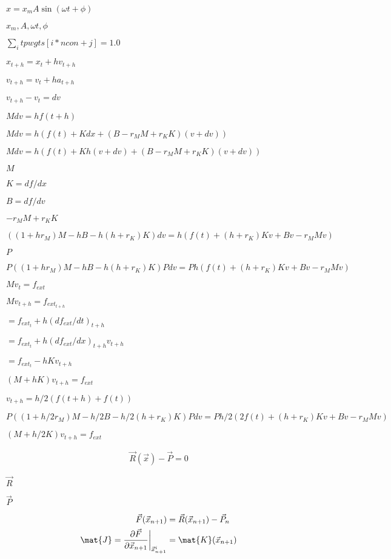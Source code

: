 \documentclass{article}
\begin{document}
$ x = x_m A \sin ( \omega t + \phi )$
\pagebreak

$ x_m, A , \omega t , \phi $
\pagebreak

$ \sum_i tpwgts[i*ncon+j] = 1.0 $
\pagebreak

$x_{t+h} = x_t + h v_{t+h}$
\pagebreak

$v_{t+h} = v_t + h a_{t+h}$
\pagebreak

$v_{t+h} - v_t = dv$
\pagebreak

$ M dv = h f(t+h) $
\pagebreak

$ M dv = h ( f(t) + K dx + (B - r_M M + r_K K) (v+dv) )$
\pagebreak

$ M dv = h ( f(t) + K h (v+dv) + (B - r_M M + r_K K) (v+dv) )$
\pagebreak

$ M $
\pagebreak

$ K = df/dx $
\pagebreak

$ B = df/dv $
\pagebreak

$- r_M M + r_K K$
\pagebreak

$ ( (1+h r_M) M - h B - h(h + r_K) K ) dv = h ( f(t) + (h+r_K) K v + B v - r_M M v )$
\pagebreak

$P$
\pagebreak

$ P ( (1+h r_M) M - h B - h(h + r_K) K ) P dv = P h ( f(t) + (h + r_K) K v + B v - r_M M v )$
\pagebreak

$ M v_t = f_{ext} $
\pagebreak

$ M v_{t+h} = f_{ext_{t+h}} $
\pagebreak

$ = f_{ext_{t}} + h (df_{ext}/dt)_{t+h} $
\pagebreak

$ = f_{ext_{t}} + h (df_{ext}/dx)_{t+h} v_{t+h} $
\pagebreak

$ = f_{ext_{t}} - h K v_{t+h} $
\pagebreak

$ ( M + h K ) v_{t+h} = f_{ext} $
\pagebreak

$v_{t+h} = h/2 ( f(t+h) + f(t) )$
\pagebreak

$ P ( (1+h/2 r_M) M - h/2 B - h/2 (h + r_K) K ) P dv = P h/2 ( 2 f(t) + (h + r_K) K v + B v - r_M M v )$
\pagebreak

$ ( M + h/2 K ) v_{t+h} = f_{ext} $
\pagebreak

\begin{eqnarray*} \vec{R}(\vec{x}) - \vec{P} = 0 \end{eqnarray*}
\pagebreak

$\vec{R}$
\pagebreak

$\vec{P}$
\pagebreak

\begin{align*} \vec{F}(\vec{x}_{n+1}) &= \vec{R}(\vec{x}_{n+1}) - \vec{P}_n \\ \mat{J} = \frac{\partial \vec{F}}{\partial \vec{x}_{n+1}} \bigg\rvert_{\vec{x}_{n+1}^i} &= \mat{K}(\vec{x}_{n+1}) \end{align*}
\pagebreak
\end{document}
